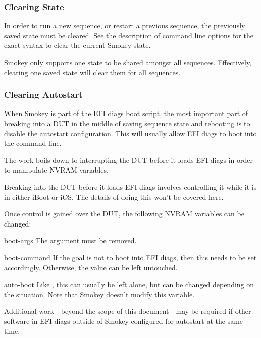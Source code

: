 \subsubsection{Clearing State}

In order to run a new sequence, or restart a previous sequence, the previously
saved state must be cleared.  See the description of command line options for
the exact syntax to clear the current Smokey state.

Smokey only supports one state to be shared amongst all sequences.
Effectively, clearing one saved state will clear them for all sequences.

\subsubsection{Clearing Autostart}

When Smokey is part of the EFI diags boot script, the most important part of
breaking into a DUT in the middle of saving sequence state and rebooting is to
disable the autostart configuration.  This will usually allow EFI diags to boot
into the command line.

The work boils down to interrupting the DUT before it loads EFI diags in order
to manipulate NVRAM variables.

Breaking into the DUT before it loads EFI diags involves controlling it while
it is in either iBoot or iOS.  The details of doing this won't be covered here.

Once control is gained over the DUT, the following NVRAM variables can be
changed:

\begin{Definition}

\item[boot-args] The  argument must be removed.

\item[boot-command] If the goal is not to boot into EFI diags, then this needs
to be set accordingly.  Otherwise, the value can be left untouched.

\item[auto-boot] Like , this can usually be left alone, but
can be changed depending on the situation.  Note that Smokey doesn't modify
this variable.

\end{Definition}

Additional work---beyond the scope of this document---may be required if other
software in EFI diags outside of Smokey configured for autostart at the same
time.


